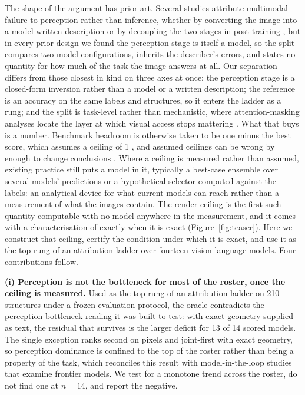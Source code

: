 The shape of the argument has prior art. Several studies attribute multimodal failure to perception rather
than inference, whether by converting the image into a model-written description \citep{arc2512} or by
decoupling the two stages in post-training \citep{decouple2605}, but in every prior design we found the
perception stage is itself a model, so the split compares two model configurations, inherits the describer's
errors, and states no quantity for how much of the task the image answers at all. Our separation differs from
those closest in kind on three axes at once: the perception stage is a closed-form inversion rather than a
model or a written description; the reference is an accuracy on the same labels and structures, so it enters
the ladder as a rung; and the split is task-level rather than mechanistic, where attention-masking analyses
locate the layer at which visual access stops mattering \citep{vab2607}. What that buys is a number. Benchmark
headroom is otherwise taken to be one minus the best score, which assumes a ceiling of 1
\citep{zerobench2502}, and assumed ceilings can be wrong by enough to change conclusions
\citep{ceilingart2605}. Where a ceiling is measured rather than assumed, existing practice still puts a model
in it, typically a best-case ensemble over several models' predictions or a hypothetical selector computed
against the labels: an analytical device for what current models can reach rather than a measurement of what
the images contain. The render ceiling is the first such quantity computable with no model anywhere in the
measurement, and it comes with a characterisation of exactly when it is exact (Figure~\ref{fig:teaser}). Here we construct that ceiling, certify the condition under which it is exact, and use it as the top rung of an attribution ladder over fourteen vision-language models. Four contributions follow.

\textbf{(i) Perception is not the bottleneck for most of the roster, once the ceiling is measured.} Used as
the top rung of an attribution ladder on 210 structures under a frozen evaluation protocol, the oracle contradicts
the perception-bottleneck reading it was built to test: with exact geometry supplied as text, the residual
that survives is the larger deficit for 13 of 14 scored models. The single exception ranks second on pixels
and joint-first with exact geometry, so perception dominance is confined to the top of the roster rather than
being a property of the task, which reconciles this result with model-in-the-loop studies that examine
frontier models. We test for a monotone trend across the roster, do not find one at $n=14$, and report the
negative.

